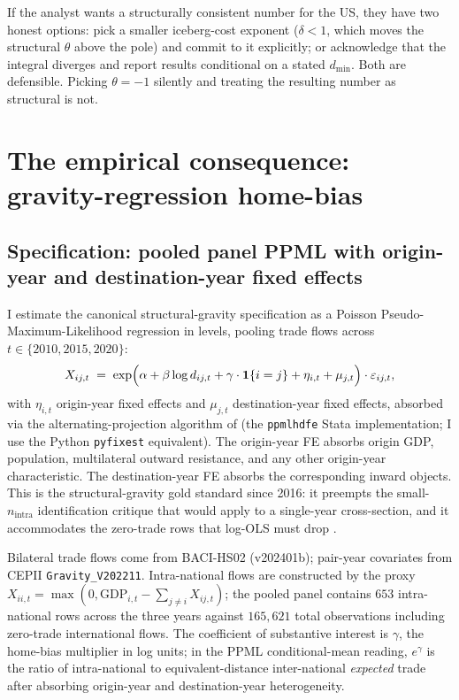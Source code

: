 \documentclass[11pt, letterpaper]{article}
\theoremstyle{definition}
\begin{document}
If the analyst wants a structurally consistent number for the US,
they have two honest options: pick a smaller iceberg-cost exponent
($\delta < 1$, which moves the structural $\theta$ above the pole)
and commit to it explicitly; or acknowledge that the integral
diverges and report results conditional on a stated $d_{\min}$. Both
are defensible. Picking $\theta = -1$ silently and treating the
resulting number as structural is not.

\section{The empirical consequence: gravity-regression home-bias}
\label{sec:empirical}

\subsection{Specification: pooled panel PPML with origin-year and destination-year fixed effects}

I estimate the
\citet{yotov_piermartini_monteiro_larch_2016} canonical structural-gravity
specification as a Poisson Pseudo-Maximum-Likelihood regression in
levels, pooling trade flows across $t \in \{2010, 2015, 2020\}$:
\begin{equation}
\label{eq:panel-ppml}
X_{ij,t} \;=\; \exp\Bigl(\alpha + \beta \log d_{ij,t} + \gamma \cdot \mathbf{1}\{i = j\} + \eta_{i,t} + \mu_{j,t}\Bigr) \cdot \varepsilon_{ij,t},
\end{equation}
with $\eta_{i,t}$ origin-year fixed effects and $\mu_{j,t}$
destination-year fixed effects, absorbed via the alternating-projection
algorithm of \citet{correia_guimaraes_zylkin_2020} (the
\texttt{ppmlhdfe} Stata implementation; I use the Python
\texttt{pyfixest} equivalent). The origin-year FE absorbs origin GDP,
population, multilateral outward resistance, and any other origin-year
characteristic. The destination-year FE absorbs the corresponding
inward objects. This is the structural-gravity gold standard since
2016: it preempts the small-$n_{\text{intra}}$ identification critique
that would apply to a single-year cross-section, and it accommodates
the zero-trade rows that log-OLS must drop \citep{silva_tenreyro_2006}.

Bilateral trade flows come from BACI-HS02 (v202401b); pair-year
covariates from CEPII \texttt{Gravity\_V202211}. Intra-national flows
are constructed by the \citet{wei_1996_intranational} proxy
$X_{ii,t} = \max(0, \mathrm{GDP}_{i,t} - \sum_{j \neq i} X_{ij,t})$;
the pooled panel contains $653$ intra-national rows across the three
years against $165{,}621$ total observations including zero-trade
international flows. The coefficient of substantive interest is
$\gamma$, the home-bias multiplier in log units; in the PPML
conditional-mean reading, $e^\gamma$ is the ratio of intra-national
to equivalent-distance inter-national \emph{expected} trade after
absorbing origin-year and destination-year heterogeneity.
\end{document}
